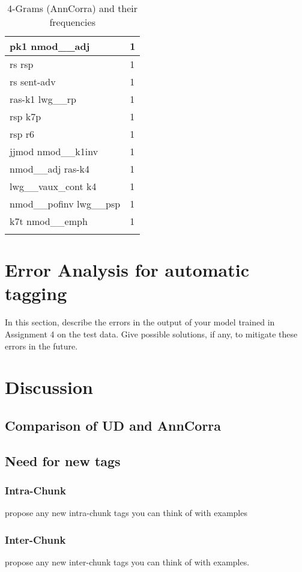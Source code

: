\documentclass[a4 paper]{article}
\begin{document}
\begin{longtable}{p{}p{}}
pk1 nmod\_\_adj  & 1 \\ \midrule
rs rsp  & 1 \\ \midrule
rs sent-adv  & 1 \\ \midrule
ras-k1 lwg\_\_rp  & 1 \\ \midrule
rsp k7p  & 1 \\ \midrule
rsp r6  & 1 \\ \midrule
jjmod nmod\_\_k1inv  & 1 \\ \midrule
nmod\_\_adj ras-k4  & 1 \\ \midrule
lwg\_\_vaux\_cont k4  & 1 \\ \midrule
nmod\_\_pofinv lwg\_\_psp  & 1 \\ \midrule
k7t nmod\_\_emph  & 1 \\ \midrule
    \caption{4-Grams (AnnCorra) and their frequencies}
\label{tab:ngram4ann}
\end{longtable}
    




\section{Error Analysis for automatic tagging}
In this section, describe the errors in the output of your model trained in Assignment 4 on the test data. Give possible solutions, if any, to mitigate these errors in the future. 

\section{Discussion}

\subsection{Comparison of UD and AnnCorra}
\subsection{Need for new tags}
\subsubsection{Intra-Chunk}
propose any new intra-chunk tags you can think of with examples
\subsubsection{Inter-Chunk}
propose any new inter-chunk tags you can think of with examples.
\end{document}
